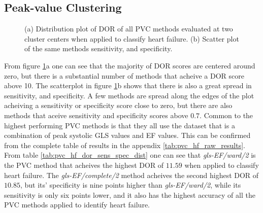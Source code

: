 \newpage

\subsection{Peak-value Clustering}

\begin{figure}[htb]
    \centering
    
    \caption{(a) Distribution plot of DOR of all PVC methods evaluated at two cluster centers when applied to classify heart failure.
             (b) Scatter plot of the same methods sensitivity, and specificity.}
    \label{fig:pvc_hf_dor_sens_spec_dist}
\end{figure}

From figure \ref{fig:pvc_hf_dor_sens_spec_dist}a one can see that the majority of DOR scores are centered around zero, 
but there is a substantial number of methods that acheive a DOR score above 10.
The scatterplot in figure \ref{fig:pvc_hf_dor_sens_spec_dist}b shows that there is also a great spread in sensitivity, and specificity. 
A few methods are spread along the edges of the plot acheiving a sensitivity or specificity score close to zero, 
but there are also methods that aceive sensitivity and specificity scores above $0.7$.
Common to the highest performing PVC methods is that they all use the dataset that is a combination of peak systolic GLS values and EF values.
This can be confirmed from the complete table of results in the appendix \ref{tab:pvc_hf_raw_results}.
From table \ref{tab:pvc_hf_dor_sens_spec_dist} one can see that \textit{gls-EF/ward/2} is the PVC method that acheives the highest DOR of $11.59$ when applied to classify heart failure.
The \textit{gls-EF/complete/2} method acheives the second highest DOR of $10.85$, but its' specificity is nine points higher than \textit{gls-EF/ward/2}, while its sensitivity is only
six points lower, and it also has the highest accuracy of all the PVC methods applied to identify heart failure.
\bigskip

